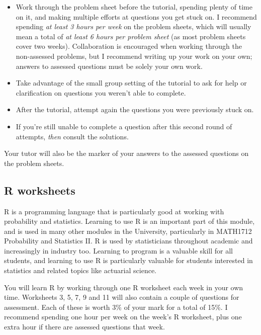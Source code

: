 \documentclass[
  a4paper,
]{book}
\providecommand{\tightlist}{%
  \setlength{\itemsep}{0pt}\setlength{\parskip}{0pt}}
\theoremstyle{definition}
\theoremstyle{definition}
\theoremstyle{definition}
\theoremstyle{definition}
\theoremstyle{remark}
\begin{document}
\begin{itemize}
\tightlist
\item
  Work through the problem sheet before the tutorial, spending plenty of time on it, and making multiple efforts at questions you get stuck on. I recommend spending \emph{at least 3 hours per week} on the problem sheets, which will usually mean a total of \emph{at least 6 hours per problem sheet} (as most problem sheets cover two weeks). Collaboration is encouraged when working through the non-assessed problems, but I recommend writing up your work on your own; answers to assessed questions must be solely your own work.
\item
  Take advantage of the small group setting of the tutorial to ask for help or clarification on questions you weren't able to complete.
\item
  After the tutorial, attempt again the questions you were previously stuck on.
\item
  If you're still unable to complete a question after this second round of attempts, \emph{then} consult the solutions.
\end{itemize}

Your tutor will also be the marker of your answers to the assessed questions on the problem sheets.

\hypertarget{r-worksheets}{%
\subsection*{R worksheets}\label{r-worksheets}}

R is a programming language that is particularly good at working with probability and statistics. Learning to use R is an important part of this module, and is used in many other modules in the University, particularly in MATH1712 Probability and Statistics II. R is used by statisticians throughout academic and increasingly in industry too. Learning to program is a valuable skill for all students, and learning to use R is particularly valuable for students interested in statistics and related topics like actuarial science.

You will learn R by working through one R worksheet each week in your own time. Worksheets 3, 5, 7, 9 and 11 will also contain a couple of questions for assessment. Each of these is worth 3\% of your mark for a total of 15\%. I recommend spending one hour per week on the week's R worksheet, plus one extra hour if there are assessed questions that week.
\end{document}
